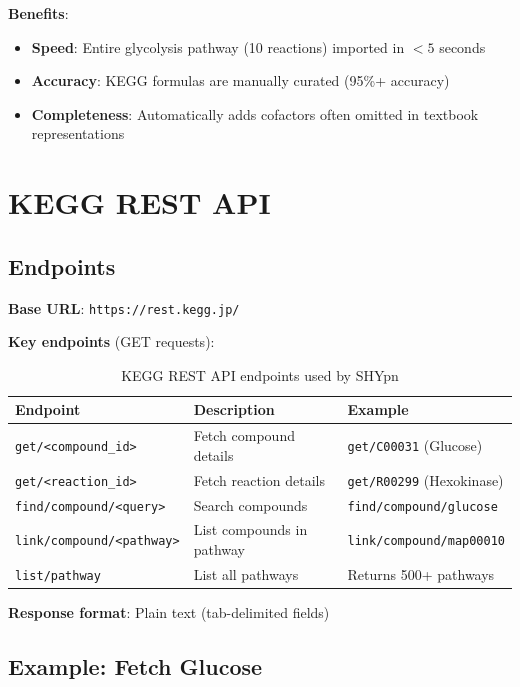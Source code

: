 \textbf{Benefits}:

\begin{itemize}
    \item \textbf{Speed}: Entire glycolysis pathway (10 reactions) imported in $<5$ seconds
    \item \textbf{Accuracy}: KEGG formulas are manually curated (95\%+ accuracy)
    \item \textbf{Completeness}: Automatically adds cofactors often omitted in textbook representations
\end{itemize}

\section{KEGG REST API}
\label{sec:kegg-rest-api}

\subsection{Endpoints}
\label{subsec:kegg-endpoints}

\textbf{Base URL}: \texttt{https://rest.kegg.jp/}

\textbf{Key endpoints} (GET requests):

\begin{table}[h]
\centering
\begin{tabular}{@{}lll@{}}
\toprule
\textbf{Endpoint} & \textbf{Description} & \textbf{Example} \\
\midrule
\texttt{get/<compound\_id>} & Fetch compound details & \texttt{get/C00031} (Glucose) \\
\texttt{get/<reaction\_id>} & Fetch reaction details & \texttt{get/R00299} (Hexokinase) \\
\texttt{find/compound/<query>} & Search compounds & \texttt{find/compound/glucose} \\
\texttt{link/compound/<pathway>} & List compounds in pathway & \texttt{link/compound/map00010} \\
\texttt{list/pathway} & List all pathways & Returns 500+ pathways \\
\bottomrule
\end{tabular}
\caption{KEGG REST API endpoints used by SHYpn}
\label{tab:kegg-endpoints}
\end{table}

\textbf{Response format}: Plain text (tab-delimited fields)

\subsection{Example: Fetch Glucose}
\label{subsec:kegg-example-glucose}

